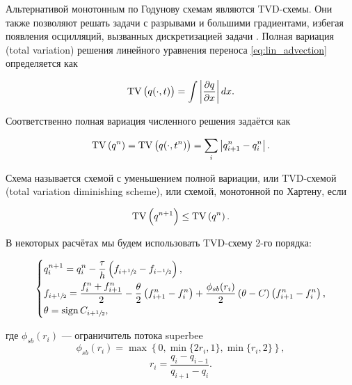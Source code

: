 Альтернативой монотонным по Годунову схемам являются TVD-схемы. Они также позволяют решать задачи с разрывами и большими градиентами, избегая появления осцилляций, вызванных дискретизацией задачи \cite{harten, rus_tvd, petrov_lobanov_book, kholodov}. 
Полная вариация (total variation) решения линейного уравнения переноса \eqref{eq:lin_advection} определяется как

\begin{equation*}
    \operatorname{TV} \left(q(\cdot, t)\right) = \int \left|\dfrac{\partial q}{\partial x}\right| dx .
\end{equation*}

\noindent Соответственно полная вариация численного решения задаётся как

\begin{equation*}
    \operatorname{TV} \left(q^n\right) = \operatorname{TV} \left(q(\cdot, t^n)\right) = \sum_i \left| q_{i+1}^n - q_i^n \right| .
\end{equation*}

\noindent Схема называется схемой с уменьшением полной вариации, или TVD-схемой (total varia\-tion diminishing scheme), или схемой, монотонной по Хартену, если

\begin{equation*}
    \operatorname{TV} \left(q^{n+1}\right) \leq \operatorname{TV} \left(q^n\right) .
\end{equation*}

В некоторых расчётах мы будем использовать TVD-схему 2-го порядка:

\begin{equation}
\begin{dcases}
    q_i^{n+1} = q_i^n - \dfrac{\tau}{h}\left(f_{i+\sfrac{1}{2}} - f_{i-\sfrac{1}{2}}\right) , \\
    f_{i+\sfrac{1}{2}} = \dfrac{f_i^n + f^n_{i+1}}{2} - \dfrac{\theta}{2}\left(f_{i+1}^n - f_i^n\right) + \dfrac{\phi_{sb}(r_i)}{2} \left(\theta - C\right) \left(f_{i+1}^n - f_i^n\right) , \\
    \theta = \operatorname{sign} C_{i+\sfrac{1}{2}} ,
\end{dcases}
\label{eq:tvd_scheme}
\end{equation}
 
\noindent где $\phi_{sb}(r_i)$ --- ограничитель потока  superbee
\begin{equation*}
    \phi_{sb}(r_i) = \max \left\{0, \min\{2r_i,1\}, \min\{r_i,2\}\right\} , 
\end{equation*}
\begin{equation*}
    r_i = \dfrac{q_i - q_{i-1}}{q_{i+1} - q_i} .
\end{equation*}

